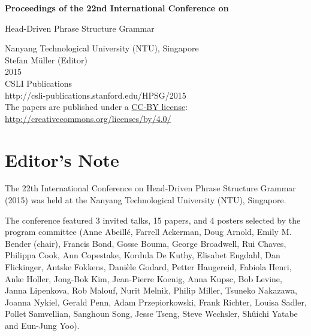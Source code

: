 \documentclass[11pt,a4paper,fleqn]{article}
\begin{document}
\begin{center}
{\Large
                {\bfseries Proceedings of the 22nd International Conference on\par Head-Driven Phrase Structure Grammar\par}

                \vspace{8ex}

                     Nanyang Technological University (NTU), Singapore\\[\baselineskip]

                        Stefan M{\"u}ller (Editor)\\[\baselineskip]

                                2015\\[\baselineskip]

                          CSLI Publications\\[\baselineskip]

              http://csli-publications.stanford.edu/HPSG/2015 \\[4\baselineskip]

The papers are published under a \href{http://creativecommons.org/licenses/by/4.0/}{CC-BY license}:\\[3pt]
\href{http://creativecommons.org/licenses/by/4.0/}{http://creativecommons.org/licenses/by/4.0/}
}
\end{center}
\newpage
\tableofcontents

\newpage

\section{Editor's Note}
The 22th International Conference on Head-Driven Phrase Structure Grammar (2015) was held at the Nanyang Technological University (NTU), Singapore.

The conference featured 3 invited talks, 15 papers, and 4 posters selected by the program committee 
(Anne Abeillé,
    Farrell Ackerman,
    Doug Arnold,
    Emily M. Bender (chair),
    Francis Bond,
    Gosse Bouma,
    George Broadwell,
    Rui Chaves,
    Philippa Cook,
    Ann Copestake,
    Kordula De Kuthy,
    Elisabet Engdahl,
    Dan Flickinger,
    Antske Fokkens,
    Danièle Godard,
    Petter Haugereid,
    Fabiola Henri,
    Anke Holler,
    Jong-Bok Kim,
    Jean-Pierre Koenig,
    Anna Kupsc,
    Bob Levine,
    Janna Lipenkova,
    Rob Malouf,
    Nurit Melnik,
    Philip Miller,
    Tsuneko Nakazawa,
    Joanna Nykiel,
    Gerald Penn,
    Adam Przepiorkowski,
    Frank Richter,
    Louisa Sadler,
    Pollet Samvellian,
    Sanghoun Song,
    Jesse Tseng,
    Steve Wechsler,
    Shûichi Yatabe and
    Eun-Jung Yoo).
\end{document}
